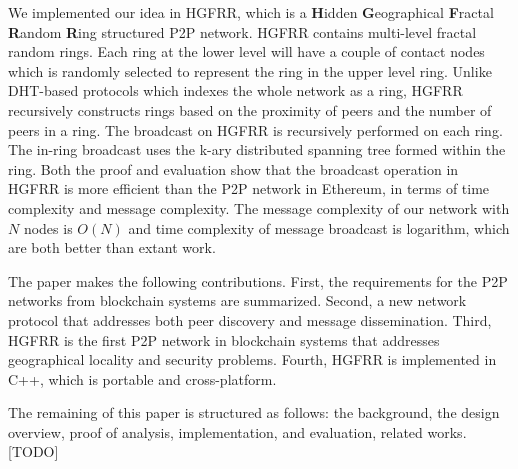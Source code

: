 We implemented our idea in HGFRR, which is a \textbf{H}idden \textbf{G}eographical \textbf{F}ractal \textbf{R}andom \textbf{R}ing structured P2P network. HGFRR contains multi-level fractal random rings. Each ring at the lower level will have a couple of contact nodes which is randomly selected to represent the ring in the upper level ring. Unlike DHT-based protocols which indexes the whole network as a ring, HGFRR recursively constructs rings based on the proximity of peers and the number of peers in a ring. The broadcast on HGFRR is recursively performed on each ring. The in-ring broadcast uses the k-ary distributed spanning tree formed within the ring. Both the proof and evaluation show that the broadcast operation in HGFRR is more efficient than the P2P network in Ethereum, in terms of time complexity and message complexity. The message complexity of our network with $N$ nodes is $O(N)$ and time complexity of message broadcast is logarithm, which are both better than extant work.

The paper makes the following contributions. First, the requirements for the P2P networks from blockchain systems are summarized. Second, a new network protocol that addresses both peer discovery and message dissemination. Third, HGFRR is the first P2P network in blockchain systems that addresses geographical locality and security problems. Fourth, HGFRR is implemented in C++, which is portable and cross-platform.

The remaining of this paper is structured as follows: the background, the design overview, proof of analysis, implementation, and evaluation, related works. [TODO]